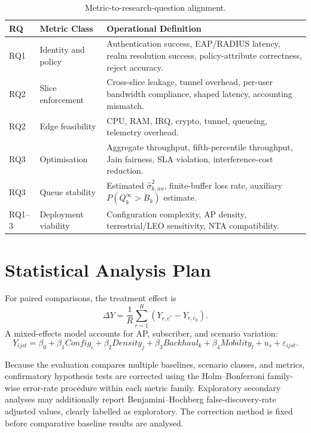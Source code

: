 \begin{table}[H]
\centering
\caption{Metric-to-research-question alignment.}
\label{tab:metrics}
\begin{tabularx}{\textwidth}{llX}
\toprule
\textbf{RQ} & \textbf{Metric Class} & \textbf{Operational Definition} \\
\midrule
RQ1 & Identity and policy & Authentication success, EAP/RADIUS latency, realm resolution success, policy-attribute correctness, reject accuracy. \\
RQ2 & Slice enforcement & Cross-slice leakage, tunnel overhead, per-user bandwidth compliance, shaped latency, accounting mismatch. \\
RQ2 & Edge feasibility & CPU, RAM, IRQ, crypto, tunnel, queueing, telemetry overhead. \\
RQ3 & Optimisation & Aggregate throughput, fifth-percentile throughput, Jain fairness, SLA violation, interference-cost reduction. \\
RQ3 & Queue stability & Estimated $\hat{\sigma}_{k,	au}^2$, finite-buffer loss rate, auxiliary $P(Q_k^\infty>B_k)$ estimate. \\
RQ1--3 & Deployment viability & Configuration complexity, AP density, terrestrial/LEO sensitivity, NTA compatibility. \\
\bottomrule
\end{tabularx}
\end{table}

\section{Statistical Analysis Plan}
\label{sec:stats}

For paired comparisons, the treatment effect is
\begin{equation}
  \Delta Y=\frac{1}{R}\sum_{r=1}^{R}(Y_{r,c^*}-Y_{r,c_0}).
  \label{eq:treatment-effect}
\end{equation}
A mixed-effects model accounts for AP, subscriber, and scenario variation:
\begin{equation}
  Y_{ijst}=\beta_0+\beta_1Config_i+\beta_2Density_j+\beta_3Backhaul_k+\beta_4Mobility_l+u_s+\varepsilon_{ijst}.
  \label{eq:mixed-effects}
\end{equation}

Because the evaluation compares multiple baselines, scenario classes, and metrics,
confirmatory hypothesis tests are corrected using the Holm--Bonferroni family-wise
error-rate procedure within each metric family. Exploratory secondary analyses may
additionally report Benjamini--Hochberg false-discovery-rate adjusted values, clearly
labelled as exploratory. The correction method is fixed before comparative baseline
results are analysed.
